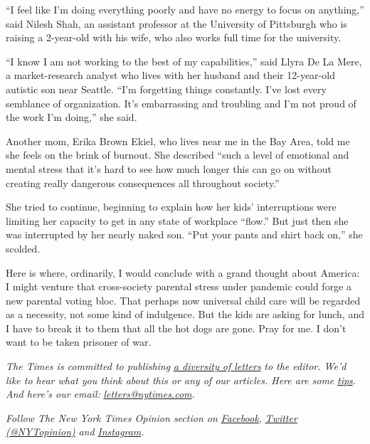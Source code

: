 ``I feel like I'm doing everything poorly and have no energy to focus on
anything,'' said Nilesh Shah, an assistant professor at the University
of Pittsburgh who is raising a 2-year-old with his wife, who also works
full time for the university.

``I know I am not working to the best of my capabilities,'' said Llyra
De La Mere, a market-research analyst who lives with her husband and
their 12-year-old autistic son near Seattle. ``I'm forgetting things
constantly. I've lost every semblance of organization. It's embarrassing
and troubling and I'm not proud of the work I'm doing,'' she said.

Another mom, Erika Brown Ekiel, who lives near me in the Bay Area, told
me she feels on the brink of burnout. She described ``such a level of
emotional and mental stress that it's hard to see how much longer this
can go on without creating really dangerous consequences all throughout
society.''

She tried to continue, beginning to explain how her kids' interruptions
were limiting her capacity to get in any state of workplace ``flow.''
But just then she was interrupted by her nearly naked son. ``Put your
pants and shirt back on,'' she scolded.

Here is where, ordinarily, I would conclude with a grand thought about
America: I might venture that cross-society parental stress under
pandemic could forge a new parental voting bloc. That perhaps now
universal child care will be regarded as a necessity, not some kind of
indulgence. But the kids are asking for lunch, and I have to break it to
them that all the hot dogs are gone. Pray for me. I don't want to be
taken prisoner of war.

\emph{The Times is committed to publishing}
\href{https://www.nytimes.com/2019/01/31/opinion/letters/letters-to-editor-new-york-times-women.html}{\emph{a
diversity of letters}} \emph{to the editor. We'd like to hear what you
think about this or any of our articles. Here are some}
\href{https://help.nytimes.com/hc/en-us/articles/115014925288-How-to-submit-a-letter-to-the-editor}{\emph{tips}}\emph{.
And here's our email:}
\href{mailto:letters@nytimes.com}{\emph{letters@nytimes.com}}\emph{.}

\emph{Follow The New York Times Opinion section on}
\href{https://www.facebook.com/nytopinion}{\emph{Facebook}}\emph{,}
\href{http://twitter.com/NYTOpinion}{\emph{Twitter (@NYTopinion)}}
\emph{and}
\href{https://www.instagram.com/nytopinion/}{\emph{Instagram}}\emph{.}


